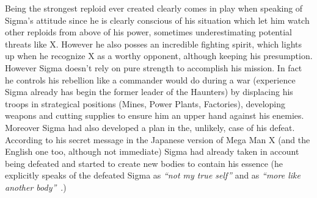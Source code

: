 Being the strongest reploid ever created clearly comes in play when speaking of Sigma's attitude since he is clearly conscious of his situation which let him watch other reploids from above of his power, sometimes underestimating potential threats like X. However he also posses an incredible fighting spirit, which lights up when he recognize X as a worthy opponent, although keeping his presumption. However Sigma doesn't rely on pure strength to accomplish his mission. In fact he controls his rebellion like a commander would do during a war (experience Sigma already has begin the former leader of the Haunters) by displacing his troops in strategical positions (Mines, Power Plants, Factories), developing weapons and cutting supplies to ensure him an upper hand against his enemies. Moreover Sigma had also developed a plan in the, unlikely, case of his defeat. According to his secret message in the Japanese version of Mega Man X (and the English one too, although not immediate) Sigma had already taken in account being defeated and started to create new bodies to contain his essence (he explicitly speaks of the defeated Sigma as \textit{``not my true self''} and as \textit{``more like another body''}~\cite{wordpress:X_japanese_script}.)
